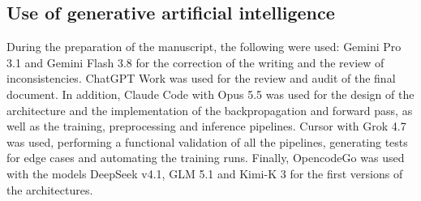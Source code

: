 \documentclass[journal]{IEEEtran}
\begin{document}
\subsection*{Use of generative artificial intelligence}
During the preparation of the manuscript, the following were used: Gemini Pro 3.1 and Gemini Flash 3.8 for the correction of the writing and the review of inconsistencies. ChatGPT Work was used for the review and audit of the final document. In addition, Claude Code with Opus 5.5 was used for the design of the architecture and the implementation of the backpropagation and forward pass, as well as the training, preprocessing and inference pipelines. Cursor with Grok 4.7 was used, performing a functional validation of all the pipelines, generating tests for edge cases and automating the training runs. Finally, OpencodeGo was used with the models DeepSeek v4.1, GLM 5.1 and Kimi-K 3 for the first versions of the architectures.



\end{document}
